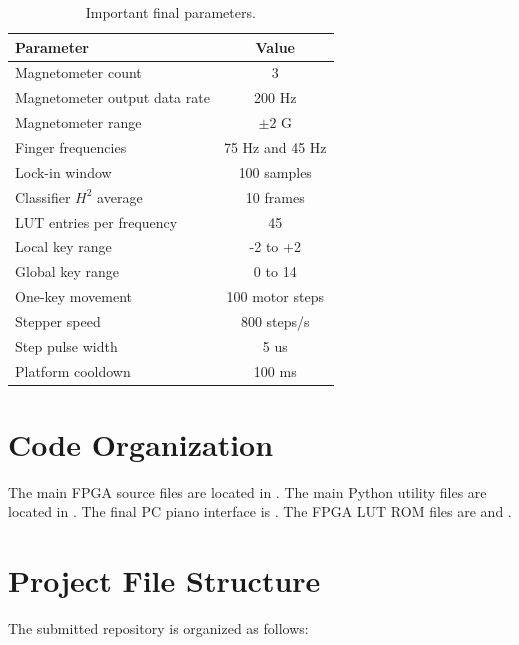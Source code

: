 \begin{table}[H]
    \centering
    \caption{Important final parameters.}
    \label{tab:runtime_parameters}
    \renewcommand{\arraystretch}{1.2}
    \begin{tabular}{l c}
        \toprule
        \textbf{Parameter} & \textbf{Value} \\
        \midrule
        Magnetometer count & 3 \\
        Magnetometer output data rate & 200 Hz \\
        Magnetometer range & $\pm 2$ G \\
        Finger frequencies & 75 Hz and 45 Hz \\
        Lock-in window & 100 samples \\
        Classifier $H^2$ average & 10 frames \\
        LUT entries per frequency & 45 \\
        Local key range & -2 to +2 \\
        Global key range & 0 to 14 \\
        One-key movement & 100 motor steps \\
        Stepper speed & 800 steps/s \\
        Step pulse width & 5 us \\
        Platform cooldown & 100 ms \\
        \bottomrule
    \end{tabular}
\end{table}

\section{Code Organization}
\label{app:code_organization}

The main FPGA source files are located in . The main Python utility files are located in . The final PC piano interface is . The FPGA LUT ROM files are  and .

\newpage
\section{Project File Structure}
\label{app:file_structure}

The submitted repository is organized as follows:

